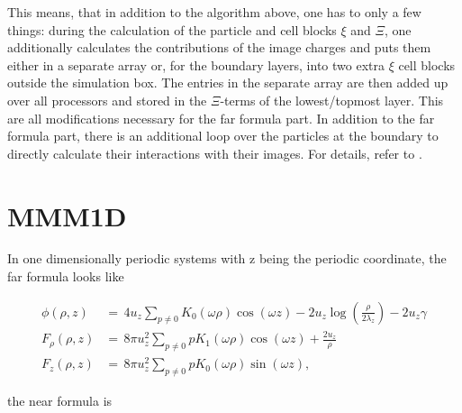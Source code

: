 This means, that in addition to the algorithm above, one has to only a
few things: during the calculation of the particle and cell blocks
$\xi$ and $\Xi$, one additionally calculates the contributions of the
image charges and puts them either in a separate array or, for the
boundary layers, into two extra $\xi$ cell blocks outside the
simulation box. The entries in the separate array are then added up
over all processors and stored in the $\Xi$-terms of the
lowest/topmost layer. This are all modifications necessary for the far
formula part. In addition to the far formula part, there is an
additional loop over the particles at the boundary to directly
calculate their interactions with their images.  For details, refer to
\citet{icmmm2d}.

\section{MMM1D}

In one dimensionally periodic systems with z being the periodic
coordinate, the far formula looks like

\[ \begin{array}{rl} \phi(\rho,z) &=\, 4 u_z\sum_{p\neq 0}
  K_0(\omega\rho)\cos(\omega z) - 2u_z\log(\frac{\rho}{2\lambda_z}) -
  2u_z\gamma\\ F_\rho(\rho,z) &=\, 8\pi u_z^2\sum_{p\neq 0} p
  K_1(\omega\rho)\cos(\omega z) + \frac{2 u_z}{\rho}\\ F_z(\rho,z)
  &=\, 8\pi u_z^2 \sum_{p\neq 0} pK_0(\omega\rho)\sin(\omega z),
\end{array} \]

the near formula is

